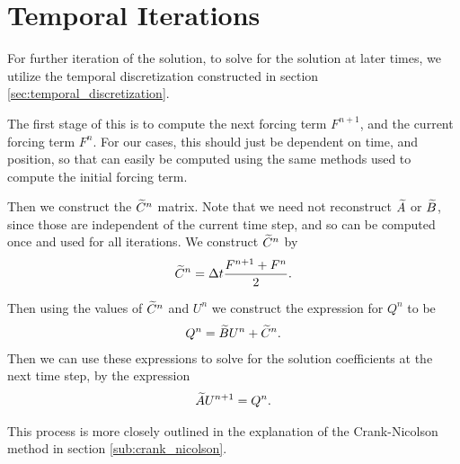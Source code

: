 \documentclass[../fem.tex]{subfile}
\begin{document}
\section{Temporal Iterations}%
\label{sec:temporal_iterations}

For further iteration of the solution, to solve for the solution at later
times, we utilize the temporal discretization constructed in section
\ref{sec:temporal_discretization}.

The first stage of this is to compute the next forcing term $F^{n+1}$, and the
current forcing term $F^{n}$. For our cases, this should just be dependent on
time, and position, so that can easily be computed using the same methods used
to compute the initial forcing term.

Then we construct the $\widetilde{C}^{n}$ matrix. Note that we need not reconstruct
$\widetilde{A}$ or $\widetilde{B}$, since those are independent of the current time step, and
so can be computed once and used for all iterations. We construct
$\widetilde{C}^{n}$ by
\begin{align*}
  \widetilde{C}^{n}=\Delta t\frac{F^{n+1}+F^{n}}{2}.
\end{align*}

Then using the values of $\widetilde{C}^n$ and $U^n$ we construct the expression for
$Q^n$ to be
\begin{align*}
  Q^n=\widetilde{B}U^n+\widetilde{C}^n.
\end{align*}
Then we can use these expressions to solve for the solution coefficients at the
next time step, by the expression
\begin{align*}
  \widetilde{A}U^{n+1}=Q^n.
\end{align*}

This process is more closely outlined in the explanation of the Crank-Nicolson
method in section \ref{sub:crank_nicolson}.
\end{document}
